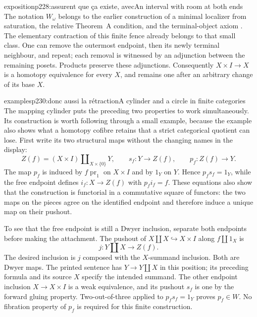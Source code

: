 \begin{dcomment}{exposition}{p228:assurent que ça existe, avec}{An interval with room at both ends}
The notation $W_\omega$ belongs to the earlier construction of a minimal localizer from saturation, the relative Theorem~A condition, and the terminal-object axiom \citep[manuscript p.~14]{Grothendieck1990XIIa}. The elementary contraction of this finite fence already belongs to that small class. One can remove the outermost endpoint, then its newly terminal neighbour, and repeat; each removal is witnessed by an adjunction between the remaining posets. Products preserve these adjunctions. Consequently $X\times I\to X$ is a homotopy equivalence for every $X$, and remains one after an arbitrary change of its base $X$.
\end{dcomment}

\begin{dcomment}{examples}{p230:donc aussi la rétraction}{A cylinder and a circle in finite categories}
The mapping cylinder puts the preceding two properties to work simultaneously. Its construction is worth following through a small example, because the example also shows what a homotopy cofibre retains that a strict categorical quotient can lose. First write its two structural maps without the changing names in the display:
\[
 Z(f)=(X\times I)\amalg_{X\times\{0\}}Y,
 \qquad s_f:Y\longrightarrow Z(f),
 \qquad p_f:Z(f)\longrightarrow Y.
\]
The map $p_f$ is induced by $f\operatorname{pr}_1$ on $X\times I$ and by $1_Y$ on $Y$. Hence $p_fs_f=1_Y$, while the free endpoint defines $i_f:X\to Z(f)$ with $p_fi_f=f$. These equations also show that the construction is functorial in a commutative square of functors: the two maps on the pieces agree on the identified endpoint and therefore induce a unique map on their pushout.

To see that the free endpoint is still a Dwyer inclusion, separate both endpoints before making the attachment. The pushout of $X\amalg X\hookrightarrow X\times I$ along $f\amalg1_X$ is
\[
 j:Y\amalg X\longrightarrow Z(f).
\]
The desired inclusion is $j$ composed with the $X$-summand inclusion. Both are Dwyer maps. The printed sentence has $Y\to Y\amalg X$ in this position; its preceding formula and its source $X$ specify the intended summand. The other endpoint inclusion $X\to X\times I$ is a weak equivalence, and its pushout $s_f$ is one by the forward gluing property. Two-out-of-three applied to $p_fs_f=1_Y$ proves $p_f\in W$. No fibration property of $p_f$ is required for this finite construction.


\end{dcomment}
